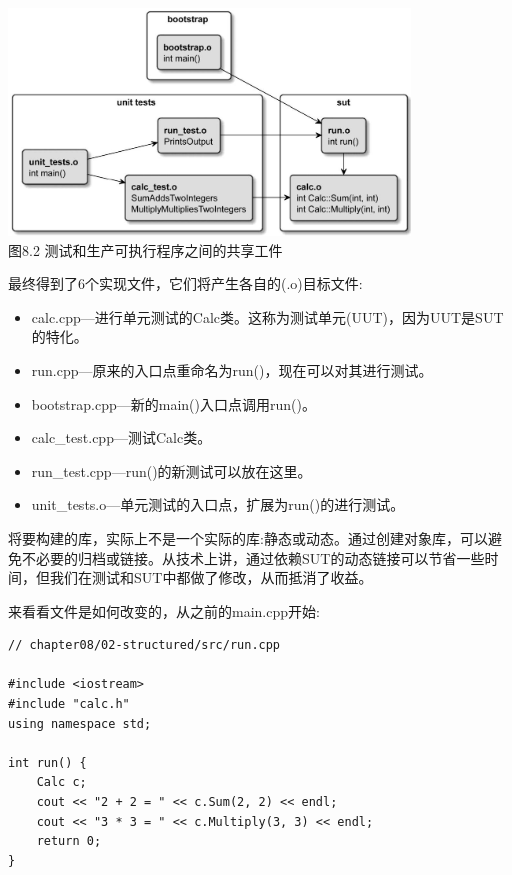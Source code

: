 \begin{center}
\includegraphics[width=0.8\textwidth]{content/3/chapter8/images/2.jpg}\\
图8.2 测试和生产可执行程序之间的共享工件
\end{center}

最终得到了6个实现文件，它们将产生各自的(.o)目标文件:

\begin{itemize}
\item 
calc.cpp—进行单元测试的Calc类。这称为测试单元(UUT)，因为UUT是SUT的特化。

\item 
run.cpp—原来的入口点重命名为run()，现在可以对其进行测试。

\item 
bootstrap.cpp—新的main()入口点调用run()。

\item 
calc\_test.cpp—测试Calc类。

\item 
run\_test.cpp—run()的新测试可以放在这里。

\item 
unit\_tests.o—单元测试的入口点，扩展为run()的进行测试。
\end{itemize}

将要构建的库，实际上不是一个实际的库:静态或动态。通过创建对象库，可以避免不必要的归档或链接。从技术上讲，通过依赖SUT的动态链接可以节省一些时间，但我们在测试和SUT中都做了修改，从而抵消了收益。

来看看文件是如何改变的，从之前的main.cpp开始:

\begin{lstlisting}[style=styleCXX]
// chapter08/02-structured/src/run.cpp

#include <iostream>
#include "calc.h"
using namespace std;

int run() {
	Calc c;
	cout << "2 + 2 = " << c.Sum(2, 2) << endl;
	cout << "3 * 3 = " << c.Multiply(3, 3) << endl;
	return 0;
}
\end{lstlisting} 

